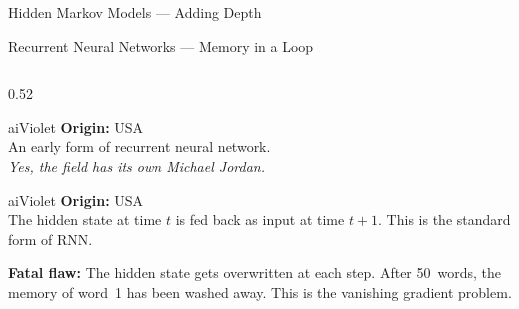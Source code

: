 \begin{frame}[shrink=14]{Hidden Markov Models --- Adding Depth}
\end{frame}

\begin{frame}[shrink=14]{Recurrent Neural Networks --- Memory in a Loop}

  \begin{columns}[T]
    \begin{column}{0.52\textwidth}
      \begin{personbox}{aiViolet}
        \textbf{Origin:} USA\\[3pt]
        An early form of recurrent neural network.\\
        \emph{Yes, the field has its own Michael Jordan.}
      \end{personbox}

      \vspace{0.2em}

      \begin{personbox}{aiViolet}
        \textbf{Origin:} USA\\[3pt]
        The hidden state at time $t$ is fed back as input at time $t{+}1$.
        This is the standard form of RNN.
      \end{personbox}

      \vspace{0.2em}
      \begin{tcolorbox}[colback=red!5,colframe=red!60,
        boxrule=0.5pt,rounded corners,left=3pt,right=3pt,top=2pt,bottom=2pt]
        \small\textbf{Fatal flaw:} The hidden state gets overwritten
        at each step. After 50~words, the memory of word~1 has been
        washed away. This is the \alert{vanishing gradient problem}.
      \end{tcolorbox}
    \end{column}


\end{columns}
\end{frame}
